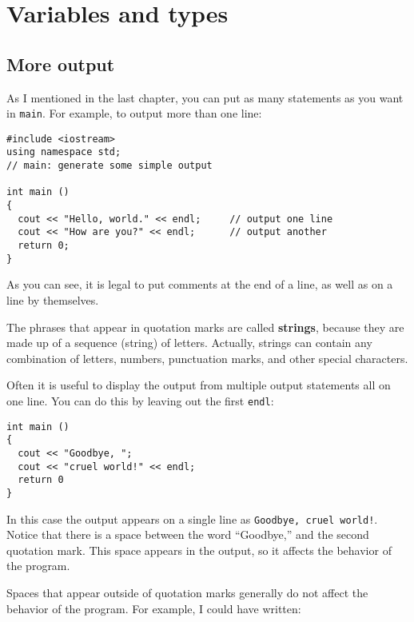 

\chapter{Variables and types}

\section{More output}

As I mentioned in the last chapter, you can put as many statements as
you want in {\tt main}.  For example, to output more than one line:

\begin{verbatim}
#include <iostream>
using namespace std;
// main: generate some simple output

int main ()
{
  cout << "Hello, world." << endl;     // output one line
  cout << "How are you?" << endl;      // output another
  return 0;
}
\end{verbatim}
%
As you can see, it is legal to put comments at the
end of a line, as well as on a line by themselves.


The phrases that appear in quotation marks are called {\bf strings},
because they are made up of a sequence (string) of letters.  Actually,
strings can contain any combination of letters, numbers, punctuation
marks, and other special characters.


Often it is useful to display the output from multiple output
statements all on one line.  You can do this by leaving out
the first {\tt endl}:

\begin{verbatim}
int main ()
{
  cout << "Goodbye, ";
  cout << "cruel world!" << endl;
  return 0
}
\end{verbatim}
%
In this case the output appears on a single line as
{\tt Goodbye, cruel world!}.  Notice that there is a space
between the word ``Goodbye,'' and the second quotation mark.
This space appears in the output, so it affects the behavior
of the program.

Spaces that appear outside of quotation marks generally do
not affect the behavior of the program.  For example, I
could have written:

